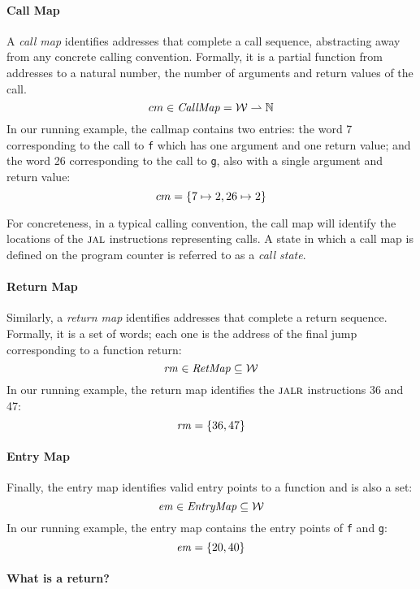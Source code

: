 \documentclass[acmsmall,review,anonymous]{acmart}\settopmatter{printfolios=true,printccs=false,printacmref=false}
\begin{document}
{\paragraph*{Call Map}

A {\em call map} identifies addresses that complete a call sequence,
abstracting away from any concrete calling convention. Formally, it is
a partial function from addresses to a natural number, the number of
arguments and return values of the call.
\[cm \in \mathit{CallMap} = {\mathcal W} \rightharpoonup \mathbb{N}\]
%
In our running example, the callmap contains two entries: the word 7
corresponding to the call to {\tt f} which has one argument and one
return value; and the word 26 corresponding to the call to {\tt g},
also with a single argument and return value:
\[ cm = \{ 7 \mapsto 2, 26 \mapsto 2\}\]

For concreteness, in a typical calling convention, the call map will
identify the locations of the $\textsc{jal}$ instructions representing calls.
A state in which a call map is defined on the program counter
is referred to as a {\it call state}.

\paragraph*{Return Map}
Similarly, a {\em return map} identifies addresses that complete a
return sequence. Formally, it is a set of words; each one
is the address of the final jump corresponding to a function return:
%
\[\mathit{rm} \in \mathit{RetMap} \subseteq {\mathcal W}\]
%
In our running example, the return map identifies the $\textsc{jalr}$
instructions 36 and 47:
\[ \mathit{rm} = \{36, 47\} \]

\paragraph*{Entry Map}
Finally, the entry map identifies valid entry points to a
function and is also a set:
\[\mathit{em} \in \mathit{EntryMap} \subseteq {\mathcal W}\]
%
In our running example, the entry map contains the entry
points of {\tt f} and {\tt g}:
\[ \mathit{em} = \{20, 40\} \]

\paragraph*{What is a return?}

}
\end{document}
